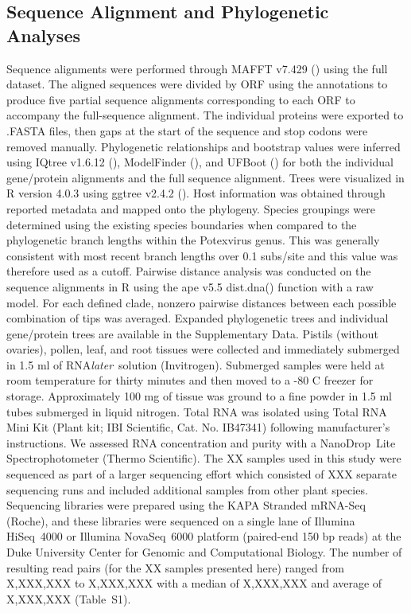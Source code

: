 \documentclass[11pt,letterpaper,titlepage]{article}
\begin{document}
\begin{linenumbers}
\subsection*{Sequence Alignment and Phylogenetic Analyses}
Sequence alignments were performed through MAFFT v7.429 (\cite{katoh_mafft_2002}) using the full dataset.
The aligned sequences were divided by ORF using the annotations to produce five partial sequence alignments corresponding to each ORF to accompany the full-sequence alignment. 
The individual proteins were exported to .FASTA files, then gaps at the start of the sequence and stop codons were removed manually. 
Phylogenetic relationships and bootstrap values were inferred using IQtree v1.6.12 (\cite{nguyen_iq-tree_2015}), ModelFinder (\cite{kalyaanamoorthy_modelfinder_2017}), and UFBoot (\cite{hoang_ufboot2_2018}) for both the individual gene/protein alignments and the full sequence alignment. 
Trees were visualized in R version 4.0.3 using ggtree v2.4.2 (\cite{yu_ggtree_2017}). 
Host information was obtained through reported metadata and mapped onto the phylogeny. 
Species groupings were determined using the existing species boundaries when compared to the phylogenetic branch lengths within the Potexvirus genus. 
This was generally consistent with most recent branch lengths over 0.1 subs/site and this value was therefore used as a cutoff. 
Pairwise distance analysis was conducted on the sequence alignments in R using the ape v5.5  dist.dna() function with a raw model. 
For each defined clade, nonzero pairwise distances between each possible combination of tips was averaged. 
Expanded phylogenetic trees and individual gene/protein trees are available in the Supplementary Data.
Pistils (without ovaries), pollen, leaf, and root tissues were collected and immediately submerged in 1.5 ml of RNA\textit{later}\texttrademark~solution (Invitrogen).
Submerged samples were held at room temperature for thirty minutes and then moved to a -80 C freezer for storage.
Approximately 100 mg of tissue was ground to a fine powder in 1.5 ml tubes submerged in liquid nitrogen.
Total RNA was isolated using Total RNA Mini Kit (Plant kit; IBI Scientific, Cat. No. IB47341) following manufacturer's instructions.
We assessed RNA concentration and purity with a NanoDrop\texttrademark~Lite Spectrophotometer (Thermo Scientific).
The XX samples used in this study were sequenced as part of a larger sequencing effort which consisted of XXX separate sequencing runs and included additional samples from other plant species.
Sequencing libraries were prepared using the KAPA Stranded mRNA-Seq (Roche), and these libraries were sequenced on a single lane of Illumina \mbox{HiSeq}~4000 or Illumina \mbox{NovaSeq}~6000 platform (paired-end 150 bp reads) at the Duke University Center for Genomic and Computational Biology.
The number of resulting read pairs (for the XX samples presented here) ranged from X,XXX,XXX to X,XXX,XXX with a median of X,XXX,XXX and average of X,XXX,XXX (Table~S1).



\end{linenumbers}
\end{document}
